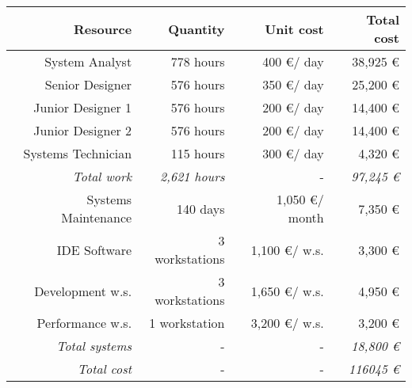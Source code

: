 
% 
\begin{tabular}{r|rr|r}
\textbf{Resource} & \textbf{Quantity} & \textbf{Unit cost} & \textbf{Total cost} \\ \hline
System Analyst & 778 hours & 400 \euro / day & 38,925  \euro \\
Senior Designer & 576 hours & 350 \euro / day & 25,200 \euro \\
Junior Designer 1 & 576 hours & 200 \euro / day & 14,400 \euro \\
Junior Designer 2 & 576 hours & 200 \euro / day & 14,400 \euro \\
Systems Technician & 115 hours & 300 \euro / day & 4,320 \euro \\ \hline
\textit{Total work} & \textit{2,621 hours} & - & \textit{97,245 \euro} \\ \hline \hline
Systems Maintenance & 140 days & 1,050 \euro / month & 7,350 \euro \\
IDE Software & 3 workstations & 1,100 \euro / w.s. & 3,300 \euro \\
Development w.s. & 3 workstations & 1,650 \euro / w.s. & 4,950 \euro \\
Performance w.s. & 1 workstation & 3,200 \euro / w.s. & 3,200 \euro \\ \hline
\textit{Total systems} & - & - & \textit{18,800 \euro} \\ \hline \hline
\textit{Total cost} & - & - & \textit{116045 \euro}
\end{tabular}